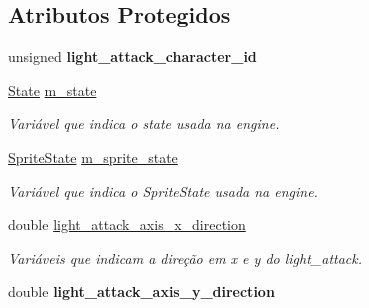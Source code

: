 \subsection*{Atributos Protegidos}
\begin{DoxyCompactItemize}
\item 
\mbox{\label{classLightAttack_ad046f76650219d857e58f301b3c93e70}} 
unsigned {\bfseries light\+\_\+attack\+\_\+character\+\_\+id}
\item 
\mbox{\label{classLightAttack_ad98d1f8f6cd1578461fc200f53758e1a}} 
\mbox{\hyperlink{classLightAttack_abbd40d40cfc1c4d9ca5f8187b10848c8}{State}} \mbox{\hyperlink{classLightAttack_ad98d1f8f6cd1578461fc200f53758e1a}{m\+\_\+state}}
\begin{DoxyCompactList}\small\item\em Variável que indica o state usada na engine. \end{DoxyCompactList}\item 
\mbox{\label{classLightAttack_a35e5a2ed495b159eb73d27e04cc6f489}} 
\mbox{\hyperlink{classLightAttack_aa960f560c78a82323220598abcaff05b}{Sprite\+State}} \mbox{\hyperlink{classLightAttack_a35e5a2ed495b159eb73d27e04cc6f489}{m\+\_\+sprite\+\_\+state}}
\begin{DoxyCompactList}\small\item\em Variável que indica o Sprite\+State usada na engine. \end{DoxyCompactList}\item 
\mbox{\label{classLightAttack_a6a0c4b116ccc6e440bb4a7751903b386}} 
double \mbox{\hyperlink{classLightAttack_a6a0c4b116ccc6e440bb4a7751903b386}{light\+\_\+attack\+\_\+axis\+\_\+x\+\_\+direction}}
\begin{DoxyCompactList}\small\item\em Variáveis que indicam a direção em x e y do light\+\_\+attack. \end{DoxyCompactList}\item 
\mbox{\label{classLightAttack_a152fe7cc652d6f2965aa4b598f1b5b4f}} 
double {\bfseries light\+\_\+attack\+\_\+axis\+\_\+y\+\_\+direction}
\item 
\mbox{\label{classLightAttack_a33ff61300d69a5227cdc7a41c4de9a61}} 

\end{DoxyCompactItemize}
